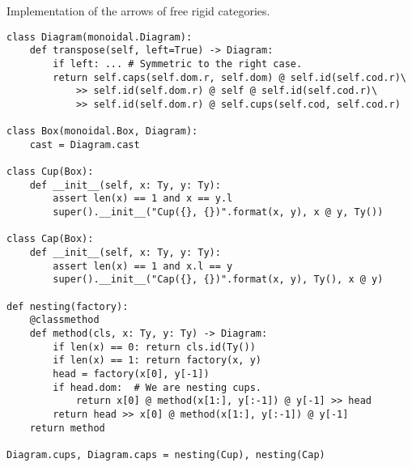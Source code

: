 \begin{python}
{\normalfont Implementation of the arrows of free rigid categories.}

\begin{verbatim}
class Diagram(monoidal.Diagram):
    def transpose(self, left=True) -> Diagram:
        if left: ... # Symmetric to the right case.
        return self.caps(self.dom.r, self.dom) @ self.id(self.cod.r)\
            >> self.id(self.dom.r) @ self @ self.id(self.cod.r)\
            >> self.id(self.dom.r) @ self.cups(self.cod, self.cod.r)

class Box(monoidal.Box, Diagram):
    cast = Diagram.cast

class Cup(Box):
    def __init__(self, x: Ty, y: Ty):
        assert len(x) == 1 and x == y.l
        super().__init__("Cup({}, {})".format(x, y), x @ y, Ty())

class Cap(Box):
    def __init__(self, x: Ty, y: Ty):
        assert len(x) == 1 and x.l == y
        super().__init__("Cap({}, {})".format(x, y), Ty(), x @ y)

def nesting(factory):
    @classmethod
    def method(cls, x: Ty, y: Ty) -> Diagram:
        if len(x) == 0: return cls.id(Ty())
        if len(x) == 1: return factory(x, y)
        head = factory(x[0], y[-1])
        if head.dom:  # We are nesting cups.
            return x[0] @ method(x[1:], y[:-1]) @ y[-1] >> head
        return head >> x[0] @ method(x[1:], y[:-1]) @ y[-1]
    return method

Diagram.cups, Diagram.caps = nesting(Cup), nesting(Cap)
\end{verbatim}
\end{python}

